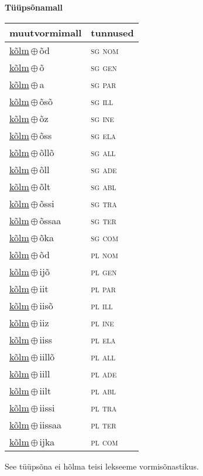 

\vspace{3.5em}
\noindent \begin{minipage}{\textwidth}
\noindent \textbf{Tüüpsõnamall \,}\\

\begin{sideways}
\begin{tabular}{l l}
muutvormimall & tunnused \\
\hline
\underline{kõlm}\,$\oplus$\,õd & \textsc{ sg nom } \\
\underline{kõlm}\,$\oplus$\,õ & \textsc{ sg gen } \\
\underline{kõlm}\,$\oplus$\,a & \textsc{ sg par } \\
\underline{kõlm}\,$\oplus$\,õsõ & \textsc{ sg ill } \\
\underline{kõlm}\,$\oplus$\,õz & \textsc{ sg ine } \\
\underline{kõlm}\,$\oplus$\,õss & \textsc{ sg ela } \\
\underline{kõlm}\,$\oplus$\,õllõ & \textsc{ sg all } \\
\underline{kõlm}\,$\oplus$\,õll & \textsc{ sg ade } \\
\underline{kõlm}\,$\oplus$\,õlt & \textsc{ sg abl } \\
\underline{kõlm}\,$\oplus$\,õssi & \textsc{ sg tra } \\
\underline{kõlm}\,$\oplus$\,õssaa & \textsc{ sg ter } \\
\underline{kõlm}\,$\oplus$\,õka & \textsc{ sg com } \\
\underline{kõlm}\,$\oplus$\,õd & \textsc{ pl nom } \\
\underline{kõlm}\,$\oplus$\,ijõ & \textsc{ pl gen } \\
\underline{kõlm}\,$\oplus$\,iit & \textsc{ pl par } \\
\underline{kõlm}\,$\oplus$\,iisõ & \textsc{ pl ill } \\
\underline{kõlm}\,$\oplus$\,iiz & \textsc{ pl ine } \\
\underline{kõlm}\,$\oplus$\,iiss & \textsc{ pl ela } \\
\underline{kõlm}\,$\oplus$\,iillõ & \textsc{ pl all } \\
\underline{kõlm}\,$\oplus$\,iill & \textsc{ pl ade } \\
\underline{kõlm}\,$\oplus$\,iilt & \textsc{ pl abl } \\
\underline{kõlm}\,$\oplus$\,iissi & \textsc{ pl tra } \\
\underline{kõlm}\,$\oplus$\,iissaa & \textsc{ pl ter } \\
\underline{kõlm}\,$\oplus$\,ijka & \textsc{ pl com } \\
\end{tabular}
\end{sideways}
\label{tab:tüüpsõnamall-kõlmõd}

\end{minipage}

 
\vspace{1em}
\noindent See tüüpsõna ei hõlma teisi lekseeme vormi\-sõnastikus.
